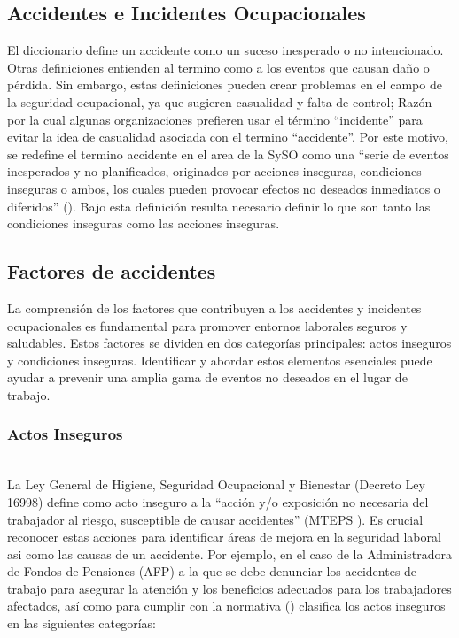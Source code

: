 \subsection{Accidentes e Incidentes Ocupacionales}
El diccionario define un accidente como un suceso inesperado o no intencionado. Otras definiciones entienden al termino como a los eventos que causan daño o pérdida. Sin embargo, estas definiciones pueden crear problemas en el campo de la seguridad ocupacional, ya que sugieren casualidad y falta de control; Razón por la cual algunas organizaciones prefieren usar el término ``incidente'' para evitar la idea de casualidad asociada con el termino ``accidente''. Por este motivo, se redefine el termino accidente en el area de la SySO como una ``serie de eventos inesperados y no planificados, originados por acciones inseguras, condiciones inseguras o ambos, los cuales pueden provocar efectos no deseados inmediatos o diferidos'' (\cite{brauer2022safety}). Bajo esta definición resulta necesario definir lo que son tanto las condiciones inseguras como las acciones inseguras.

\subsection{Factores de accidentes}
La comprensión de los factores que contribuyen a los accidentes y incidentes ocupacionales es fundamental para promover entornos laborales seguros y saludables. Estos factores se dividen en dos categorías principales: actos inseguros y condiciones inseguras. Identificar y abordar estos elementos esenciales puede ayudar a prevenir una amplia gama de eventos no deseados en el lugar de trabajo.

\subsubsection{Actos Inseguros}\hfill\\
\indent
La Ley General de Higiene, Seguridad Ocupacional y Bienestar (Decreto Ley 16998) define como acto inseguro a la ``acción y/o exposición no necesaria del trabajador al riesgo, susceptible de causar accidentes'' (MTEPS \citeyear{Bolivia1979}).  Es crucial reconocer estas acciones para identificar áreas de mejora en la seguridad laboral asi como las causas de un accidente. Por ejemplo, en el caso de la Administradora de Fondos de Pensiones (AFP) a la que se debe denunciar los accidentes de trabajo para asegurar la atención y los beneficios adecuados para los trabajadores afectados, así como para cumplir con la normativa (\cite{Bolivia2004}) clasifica los actos inseguros en las siguientes categorías:

